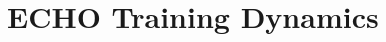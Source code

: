\documentclass[11pt]{article}
\theoremstyle{plain}
\theoremstyle{definition}
\theoremstyle{remark}
\begin{document}




\section{ECHO Training Dynamics}
\label{app:training_dynamics}
\end{document}

